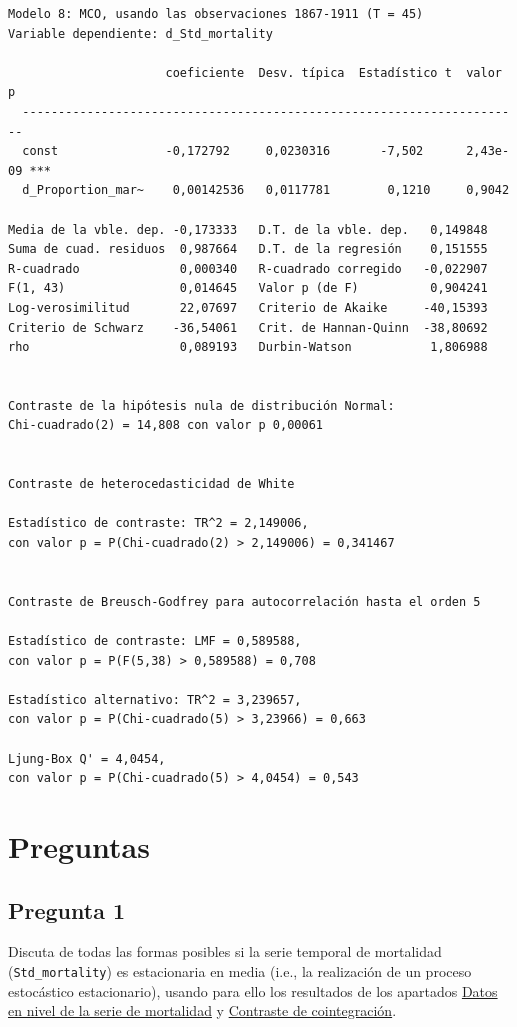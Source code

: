 \documentclass[10pt]{article}
\begin{document}
\begin{verbatim}
Modelo 8: MCO, usando las observaciones 1867-1911 (T = 45)
Variable dependiente: d_Std_mortality

                      coeficiente  Desv. típica  Estadístico t  valor p 
  ----------------------------------------------------------------------
  const               -0,172792     0,0230316       -7,502      2,43e-09 ***
  d_Proportion_mar~    0,00142536   0,0117781        0,1210     0,9042  

Media de la vble. dep. -0,173333   D.T. de la vble. dep.   0,149848
Suma de cuad. residuos  0,987664   D.T. de la regresión    0,151555
R-cuadrado              0,000340   R-cuadrado corregido   -0,022907
F(1, 43)                0,014645   Valor p (de F)          0,904241
Log-verosimilitud       22,07697   Criterio de Akaike     -40,15393
Criterio de Schwarz    -36,54061   Crit. de Hannan-Quinn  -38,80692
rho                     0,089193   Durbin-Watson           1,806988


Contraste de la hipótesis nula de distribución Normal:
Chi-cuadrado(2) = 14,808 con valor p 0,00061


Contraste de heterocedasticidad de White

Estadístico de contraste: TR^2 = 2,149006,
con valor p = P(Chi-cuadrado(2) > 2,149006) = 0,341467


Contraste de Breusch-Godfrey para autocorrelación hasta el orden 5

Estadístico de contraste: LMF = 0,589588,
con valor p = P(F(5,38) > 0,589588) = 0,708

Estadístico alternativo: TR^2 = 3,239657,
con valor p = P(Chi-cuadrado(5) > 3,23966) = 0,663

Ljung-Box Q' = 4,0454,
con valor p = P(Chi-cuadrado(5) > 4,0454) = 0,543
\end{verbatim}
\section*{Preguntas}
\label{sec:orgeb4b32c}

\subsection*{Pregunta 1}
\label{sec:org9c5855f}

Discuta de todas las formas posibles si la serie temporal de
mortalidad (\texttt{Std\_mortality}) es estacionaria en media (i.e., la
realización de un proceso estocástico estacionario), usando para ello
los resultados de los apartados \hyperref[sec:orgebe8751]{Datos en nivel de la serie de mortalidad} y \hyperref[sec:org6ae8cb0]{Contraste de cointegración}.
\end{document}
